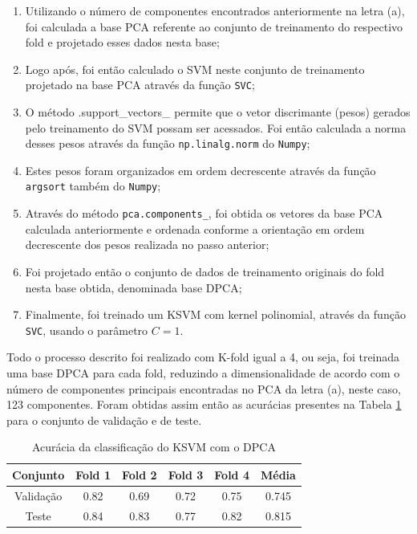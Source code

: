 \documentclass[]{abntex2}
\begin{document}
\begin{enumerate}
    \item Utilizando o número de componentes encontrados anteriormente na letra (a), foi calculada a base PCA referente ao conjunto de treinamento do respectivo fold e projetado esses dados nesta base;
    \item Logo após, foi então calculado o SVM neste conjunto de treinamento projetado na base PCA através da função \texttt{SVC};
    \item O método {.support\_vectors\_} permite que o vetor discrimante (pesos) gerados pelo treinamento do SVM possam ser acessados. Foi então calculada a norma desses pesos através da função \texttt{np.linalg.norm} do \texttt{Numpy};
    \item Estes pesos foram organizados em ordem decrescente através da função \texttt{argsort} também do \texttt{Numpy};
    \item Através do método \texttt{pca.components\_}, foi obtida os vetores da base PCA calculada anteriormente e ordenada conforme a orientação em ordem decrescente dos pesos realizada no passo anterior;
    \item Foi projetado então o conjunto de dados de treinamento originais do fold nesta base obtida, denominada base DPCA;
    \item Finalmente, foi treinado um KSVM com kernel polinomial, através da função \texttt{SVC}, usando o parâmetro $C=1$.
\end{enumerate}

 Todo o processo descrito foi realizado com K-fold igual a 4, ou seja, foi treinada uma base DPCA para cada fold, reduzindo a dimensionalidade de acordo com o número de componentes principais encontradas no PCA da letra (a), neste caso, 123 componentes. Foram obtidas assim então as acurácias presentes na Tabela \ref{tab:dpca_ksvm} para o conjunto de validação e de teste.

\begin{table}[H]
    \centering
    \begin{tabular}{|c|c|c|c|c|c|}
    \hline
    \rowcolor[HTML]{C0C0C0} 
    Conjunto                          & Fold 1 & Fold 2 & Fold 3 & Fold 4 & Média  \\ \hline
    \cellcolor[HTML]{C0C0C0}Validação & 0.82   & 0.69  & 0.72   & 0.75   & 0.745  \\ \hline
    \cellcolor[HTML]{C0C0C0}Teste     & 0.84   & 0.83   & 0.77   & 0.82   & 0.815 \\ \hline
    \end{tabular}
    \caption{Acurácia da classificação do KSVM com o DPCA}
    \label{tab:dpca_ksvm}
\end{table}
\end{document}
